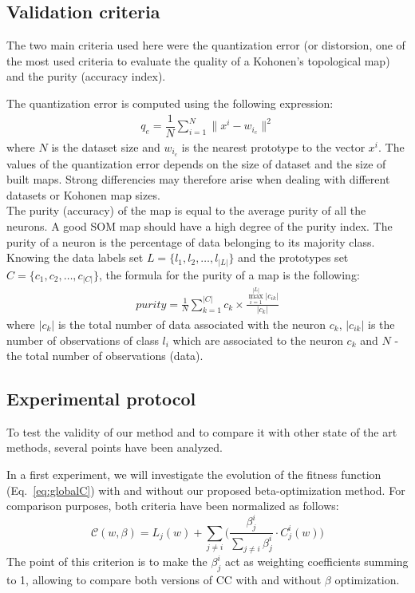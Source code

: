 \subsection{Validation criteria}
The two main criteria used here were the quantization error (or distorsion, one of the most used criteria to evaluate the quality of a Kohonen's topological map) and the purity (accuracy index).

The quantization error is computed using the following expression: \\
\begin{eqnarray}
q_e = \dfrac{1}{N}\sum_{i=1}^N \| x^{i} - w_{i_c} \|^{2}
\end{eqnarray}
where $N$ is the dataset size and $w_{i_c}$ is the nearest prototype to the vector $x^{i}$.
The values of the quantization error depends on the size of dataset and the size of built maps. Strong differencies may therefore arise when dealing with different datasets or Kohonen map sizes.\\

The purity (accuracy) of the map is equal to the average purity of all the neurons.
A good SOM map should have a high degree of the purity index.
The purity of a neuron is the percentage of data belonging to its majority class.
Knowing the data labels set $L = \{l_{1}, l_{2}, \ldots,  l_{|L|}\}$ and the prototypes set
$C = \{c_{1}, c_{2}, \ldots, c_{|C|}\}$, the formula for the purity of a map is the following:\\

\begin{eqnarray}
purity = \frac{1}{N} \sum_{k=1}^{|C|} c_{k}\times \frac{\max_{i=1}^{|L|}|c_{ik}|}{|c_{k}|}
\end{eqnarray}
where $|c_k|$ is the total number of data associated with the neuron $c_k$, $|c_{ik}| $ is the number of observations
of class $l_{i}$ which are associated to the neuron $c_{k}$ and $N$ - the total number of observations (data).\\%



\subsection{Experimental protocol}
To test the validity of our method and to compare it with other state of the art methods, several points have been analyzed. 

In a first experiment, we will investigate the evolution of the fitness function (Eq.~\ref{eq:globalC}) with and without our proposed beta-optimization method. For comparison purposes, both criteria have been normalized as follows: 
\begin{equation}
\mathcal{C}(w,\beta) = L_j(w) +
\sum_{j \neq i} \Big(\frac{\beta_j^i}{\sum_{j \neq i}\beta_j^i} \cdot C_j^i(w)\Big)	
\label{eq:globalC2}
\end{equation}
The point of this criterion is to make the $\beta_j^i$ act as weighting coefficients summing to 1, allowing to compare both versions of CC with and without $\beta$ optimization. \\

